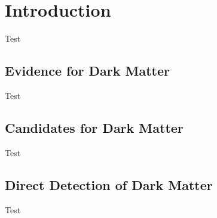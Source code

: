 \chapter{Introduction}
Test
\section{Evidence for Dark Matter}
Test
\section{Candidates for Dark Matter}
Test
\section{Direct Detection of Dark Matter}
Test